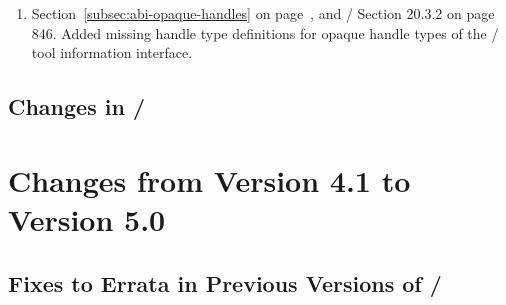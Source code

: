 \begin{enumerate}
\item
  Section~\ref{subsec:abi-opaque-handles} on page~\pageref{subsec:abi-opaque-handles}, and \MPIVDOTO/ Section 20.3.2 on page 846.
  \newline
  Added missing handle type definitions for opaque handle types of the \MPI/ tool information interface.

\end{enumerate}

\subsection{Changes in \texorpdfstring{\MPIVDOTI/}{MPI-5.1}}
\label{subsec:changes-50-51}


\section{Changes from Version 4.1 to Version 5.0}
\label{subsec:41to50}
\label{sec:change:recent}

\subsection{Fixes to Errata in Previous Versions of \texorpdfstring{\MPI/}{MPI}}
\label{sec:changes-41-50-errata}

